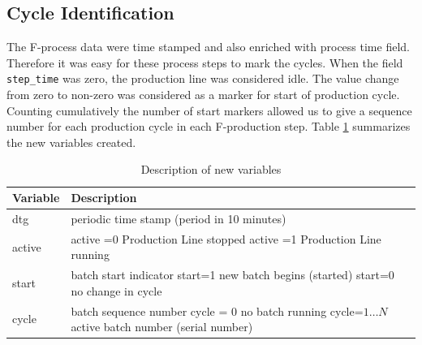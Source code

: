 \documentclass{article}
\begin{document}
\subsection{Cycle Identification}
The F-process data were time stamped and also enriched with process time field. Therefore it was easy for these process steps to mark the cycles. When the field \texttt{step\_time} was zero, the production line was considered idle. The value change from zero to non-zero was considered as a marker for start of production cycle. Counting cumulatively the number of start markers allowed us to give a sequence number for each production cycle in each F-production step. Table \ref{tab:new_attributes} summarizes the new variables created.

\begin{table}[]
    \centering
    \begin{tabular}{l p{9.5cm}}
        Variable &  Description \\
        \hline
        dtg & periodic time stamp (period in 10 minutes) \\
        active &   	    active =0   Production Line stopped \newline
                        active =1   Production Line running
        \\
        start&	        batch start indicator \newline
                        start=1 new batch begins (started) \newline
                        start=0 no change in cycle
        \\
        cycle&	batch sequence number \newline
                cycle = 0 no batch running \newline
                cycle=$1\ldots N$  active batch number (serial number)
        \\
        \hline
    \end{tabular}
    \caption{Description of new variables}
    \label{tab:new_attributes}
\end{table}
\end{document}

